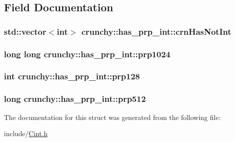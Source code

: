 \subsection{Field Documentation}
\hypertarget{structcrunchy_1_1has__prp__int_aad3a0422efea97f7b9bee027cfcb52db}{}
\subsubsection[{crn\+Has\+Not\+Int}]{\setlength{\rightskip}{0pt plus 5cm}std\+::vector$<$int$>$ crunchy\+::has\+\_\+prp\+\_\+int\+::crn\+Has\+Not\+Int}\label{structcrunchy_1_1has__prp__int_aad3a0422efea97f7b9bee027cfcb52db}
\hypertarget{structcrunchy_1_1has__prp__int_ace46d5f0b237274c2e320ce7c5a36d79}{}
\subsubsection[{prp1024}]{\setlength{\rightskip}{0pt plus 5cm}long long crunchy\+::has\+\_\+prp\+\_\+int\+::prp1024\hspace{0.3cm}{\ttfamily [static]}}\label{structcrunchy_1_1has__prp__int_ace46d5f0b237274c2e320ce7c5a36d79}
\hypertarget{structcrunchy_1_1has__prp__int_a0cd751991192d1399da3d87e53ee6107}{}
\subsubsection[{prp128}]{\setlength{\rightskip}{0pt plus 5cm}int crunchy\+::has\+\_\+prp\+\_\+int\+::prp128\hspace{0.3cm}{\ttfamily [static]}}\label{structcrunchy_1_1has__prp__int_a0cd751991192d1399da3d87e53ee6107}
\hypertarget{structcrunchy_1_1has__prp__int_a0d4a6dff87f95d843e28ea7370bef23f}{}
\subsubsection[{prp512}]{\setlength{\rightskip}{0pt plus 5cm}long crunchy\+::has\+\_\+prp\+\_\+int\+::prp512\hspace{0.3cm}{\ttfamily [static]}}\label{structcrunchy_1_1has__prp__int_a0d4a6dff87f95d843e28ea7370bef23f}


The documentation for this struct was generated from the following file\+:\begin{DoxyCompactItemize}
\item 
include/\hyperlink{_cint_8h}{Cint.\+h}\end{DoxyCompactItemize}
